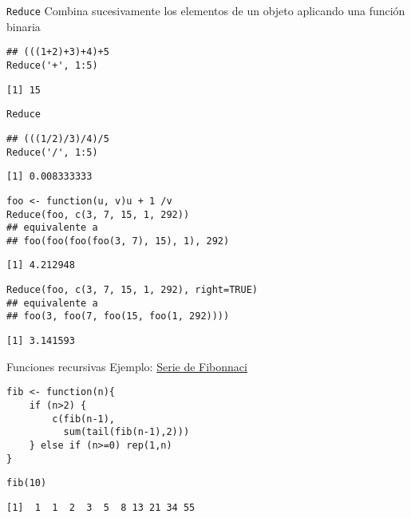 \documentclass[xcolor={usenames,svgnames,dvipsnames}]{beamer}
\begin{document}
\begin{frame}[label={sec:orgbeeb4b8},fragile]{\texttt{Reduce}}
 Combina sucesivamente los elementos de un objeto aplicando una función binaria
\lstset{language=r,label= ,caption= ,captionpos=b,numbers=none}
\begin{lstlisting}
## (((1+2)+3)+4)+5
Reduce('+', 1:5)
\end{lstlisting}

\begin{verbatim}
[1] 15
\end{verbatim}
\end{frame}

\begin{frame}[label={sec:orge13435f},fragile]{\texttt{Reduce}}
 \lstset{language=r,label= ,caption= ,captionpos=b,numbers=none}
\begin{lstlisting}
## (((1/2)/3)/4)/5
Reduce('/', 1:5)
\end{lstlisting}

\begin{verbatim}
[1] 0.008333333
\end{verbatim}


\lstset{language=r,label= ,caption= ,captionpos=b,numbers=none}
\begin{lstlisting}
foo <- function(u, v)u + 1 /v
Reduce(foo, c(3, 7, 15, 1, 292))
## equivalente a
## foo(foo(foo(foo(3, 7), 15), 1), 292)
\end{lstlisting}

\begin{verbatim}
[1] 4.212948
\end{verbatim}


\lstset{language=r,label= ,caption= ,captionpos=b,numbers=none}
\begin{lstlisting}
Reduce(foo, c(3, 7, 15, 1, 292), right=TRUE)
## equivalente a
## foo(3, foo(7, foo(15, foo(1, 292))))
\end{lstlisting}

\begin{verbatim}
[1] 3.141593
\end{verbatim}
\end{frame}

\begin{frame}[label={sec:org54048cf},fragile]{Funciones recursivas}
 Ejemplo: \href{http://en.wikibooks.org/wiki/R\_Programming/Working\_with\_functions\#Functions\_as\_Objects}{Serie de Fibonnaci}
\lstset{language=r,label= ,caption= ,captionpos=b,numbers=none}
\begin{lstlisting}
fib <- function(n){
    if (n>2) {
        c(fib(n-1),
          sum(tail(fib(n-1),2)))
    } else if (n>=0) rep(1,n)
}
\end{lstlisting}

\lstset{language=r,label= ,caption= ,captionpos=b,numbers=none}
\begin{lstlisting}
fib(10)
\end{lstlisting}

\begin{verbatim}
[1]  1  1  2  3  5  8 13 21 34 55
\end{verbatim}
\end{frame}
\end{document}
